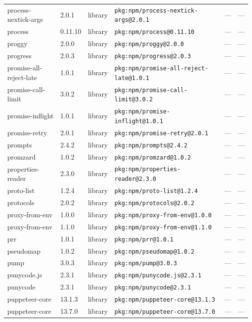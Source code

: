 \documentclass[11pt]{article}
\begin{document}
\begin{longtable}{|l|l|l|p{2.2cm}|l|p{4cm}|}
process-nextick-args & 2.0.1 & library & \texttt{pkg:npm/process-nextick-args@2.0.1} & — & — \\
process & 0.11.10 & library & \texttt{pkg:npm/process@0.11.10} & — & — \\
proggy & 2.0.0 & library & \texttt{pkg:npm/proggy@2.0.0} & — & — \\
progress & 2.0.3 & library & \texttt{pkg:npm/progress@2.0.3} & — & — \\
promise-all-reject-late & 1.0.1 & library & \texttt{pkg:npm/promise-all-reject-late@1.0.1} & — & — \\
promise-call-limit & 3.0.2 & library & \texttt{pkg:npm/promise-call-limit@3.0.2} & — & — \\
promise-inflight & 1.0.1 & library & \texttt{pkg:npm/promise-inflight@1.0.1} & — & — \\
promise-retry & 2.0.1 & library & \texttt{pkg:npm/promise-retry@2.0.1} & — & — \\
prompts & 2.4.2 & library & \texttt{pkg:npm/prompts@2.4.2} & — & — \\
promzard & 1.0.2 & library & \texttt{pkg:npm/promzard@1.0.2} & — & — \\
properties-reader & 2.3.0 & library & \texttt{pkg:npm/properties-reader@2.3.0} & — & — \\
proto-list & 1.2.4 & library & \texttt{pkg:npm/proto-list@1.2.4} & — & — \\
protocols & 2.0.2 & library & \texttt{pkg:npm/protocols@2.0.2} & — & — \\
proxy-from-env & 1.0.0 & library & \texttt{pkg:npm/proxy-from-env@1.0.0} & — & — \\
proxy-from-env & 1.1.0 & library & \texttt{pkg:npm/proxy-from-env@1.1.0} & — & — \\
prr & 1.0.1 & library & \texttt{pkg:npm/prr@1.0.1} & — & — \\
pseudomap & 1.0.2 & library & \texttt{pkg:npm/pseudomap@1.0.2} & — & — \\
pump & 3.0.3 & library & \texttt{pkg:npm/pump@3.0.3} & — & — \\
punycode.js & 2.3.1 & library & \texttt{pkg:npm/punycode.js@2.3.1} & — & — \\
punycode & 2.3.1 & library & \texttt{pkg:npm/punycode@2.3.1} & — & — \\
puppeteer-core & 13.1.3 & library & \texttt{pkg:npm/puppeteer-core@13.1.3} & — & — \\
puppeteer-core & 13.7.0 & library & \texttt{pkg:npm/puppeteer-core@13.7.0} & — & — \\

\end{longtable}
\end{document}
